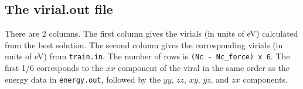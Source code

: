 \documentclass[12pt,a4paper]{report}
\begin{document}
\subsection{The virial.out file}

There are 2 columns. The first column gives the virials (in units of eV) calculated from the best solution. The second column gives the corresponding virials (in units of eV) from \verb"train.in". The number of rows is \verb"(Nc - Nc_force) x 6". The first 1/6 corresponds to the $xx$ component of the viral in the same order as the energy data in \verb"energy.out", followed by the $yy$, $zz$, $xy$, $yz$, and $zx$ components.




\end{document}
